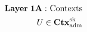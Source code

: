 \documentclass[preview]{standalone}
\begin{document}
\begin{align*}
\special{dvisvgm:raw <g id='unique000'>}\mathbf{Layer\;1A:}\text{ Contexts}\\U\in\mathbf{Ctx}_{\text{adm}}^{\text{sk}}\special{dvisvgm:raw </g>}
\end{align*}
\end{document}
